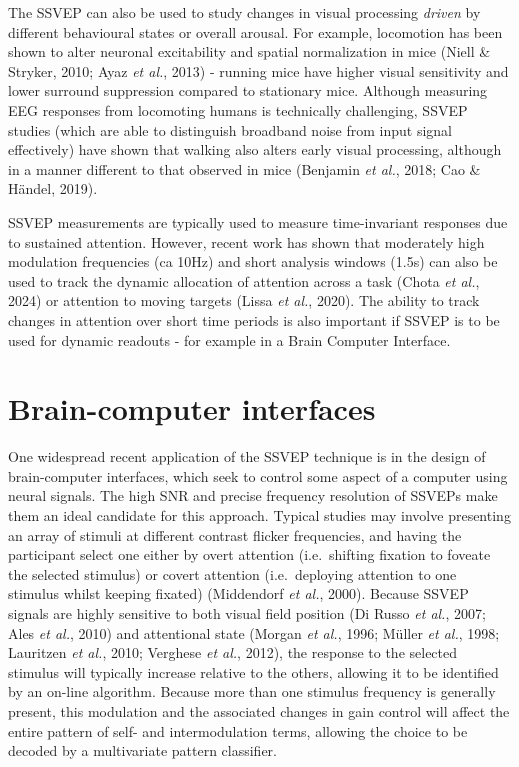 \documentclass[
  letterpaper,
  DIV=11,
  numbers=noendperiod]{scrartcl}
\begin{document}
The SSVEP can also be used to study changes in visual processing
\textit{driven} by different behavioural states or overall arousal. For
example, locomotion has been shown to alter neuronal excitability and
spatial normalization in mice (Niell \& Stryker, 2010; Ayaz \emph{et
al.}, 2013) - running mice have higher visual sensitivity and lower
surround suppression compared to stationary mice. Although measuring EEG
responses from locomoting humans is technically challenging, SSVEP
studies (which are able to distinguish broadband noise from input signal
effectively) have shown that walking also alters early visual
processing, although in a manner different to that observed in mice
(Benjamin \emph{et al.}, 2018; Cao \& Händel, 2019).

SSVEP measurements are typically used to measure time-invariant
responses due to sustained attention. However, recent work has shown
that moderately high modulation frequencies (ca 10Hz) and short analysis
windows (1.5s) can also be used to track the dynamic allocation of
attention across a task (Chota \emph{et al.}, 2024) or attention to
moving targets (Lissa \emph{et al.}, 2020). The ability to track changes
in attention over short time periods is also important if SSVEP is to be
used for dynamic readouts - for example in a Brain Computer Interface.

\section{Brain-computer interfaces}\label{brain-computer-interfaces}

One widespread recent application of the SSVEP technique is in the
design of brain-computer interfaces, which seek to control some aspect
of a computer using neural signals. The high SNR and precise frequency
resolution of SSVEPs make them an ideal candidate for this approach.
Typical studies may involve presenting an array of stimuli at different
contrast flicker frequencies, and having the participant select one
either by overt attention (i.e.~shifting fixation to foveate the
selected stimulus) or covert attention (i.e.~deploying attention to one
stimulus whilst keeping fixated) (Middendorf \emph{et al.}, 2000).
Because SSVEP signals are highly sensitive to both visual field position
(Di Russo \emph{et al.}, 2007; Ales \emph{et al.}, 2010) and attentional
state (Morgan \emph{et al.}, 1996; Müller \emph{et al.}, 1998; Lauritzen
\emph{et al.}, 2010; Verghese \emph{et al.}, 2012), the response to the
selected stimulus will typically increase relative to the others,
allowing it to be identified by an on-line algorithm. Because more than
one stimulus frequency is generally present, this modulation and the
associated changes in gain control will affect the entire pattern of
self- and intermodulation terms, allowing the choice to be decoded by a
multivariate pattern classifier.
\end{document}
